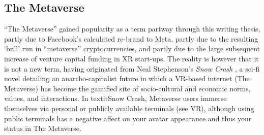 \subsection{The Metaverse}
“The Metaverse” gained popularity as a term partway through this writing thesis, partly due to Facebook’s calculated re-brand to Meta, partly due to the resulting ‘bull’ run in “metaverse” cryptocurrencies, and partly due to the large subsequent increase of venture capital funding in XR start-ups. The reality is however that it is not a new term, having originated from Neal Stephenson’s \textit{Snow Crash} \citep[]{stephenson1992}, a sci-fi novel detailing an anarcho-capitalist future in which a VR-based internet (The Metaverse) has become the gamified site of socio-cultural and economic norms, values, and interactions. In textit{Snow Crash}, Metaverse users immerse themselves via personal or publicly available terminals (see VR), although using public terminals has a negative affect on your avatar appearance and thus your status in The Metaverse.

